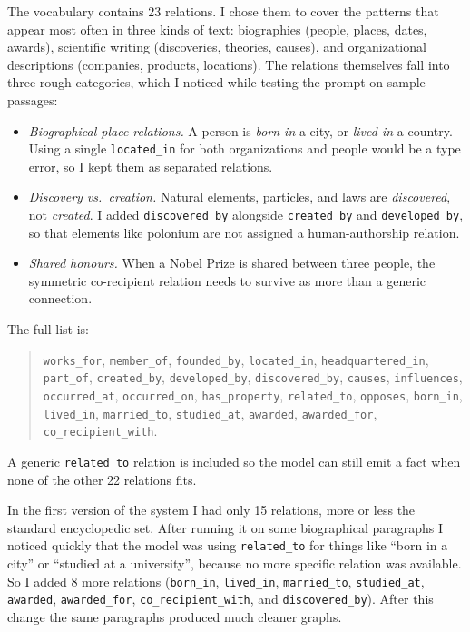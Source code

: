 \documentclass[11pt,a4paper]{article}
\begin{document}
The vocabulary contains 23 relations. I chose them to cover the patterns that appear most often in three kinds of text: biographies (people, places, dates, awards), scientific writing (discoveries, theories, causes), and organizational descriptions (companies, products, locations). The relations themselves fall into three rough categories, which I noticed while testing the prompt on sample passages:

\begin{itemize}[leftmargin=1.5em]
  \item \textit{Biographical place relations.} A person is \emph{born in} a city, or \emph{lived in} a country. Using a single \texttt{located\_in} for both organizations and people would be a type error, so I kept them as separated relations.
  \item \textit{Discovery vs.\ creation.} Natural elements, particles, and laws are \emph{discovered}, not \emph{created}. I added \texttt{discovered\_by} alongside \texttt{created\_by} and \texttt{developed\_by}, so that elements like polonium are not assigned a human-authorship relation.
  \item \textit{Shared honours.} When a Nobel Prize is shared between three people, the symmetric co-recipient relation needs to survive as more than a generic connection.
\end{itemize}

The full list is:

\begin{quote}\small
\texttt{works\_for}, \texttt{member\_of}, \texttt{founded\_by}, \texttt{located\_in}, \texttt{headquartered\_in}, \texttt{part\_of}, \texttt{created\_by}, \texttt{developed\_by}, \texttt{discovered\_by}, \texttt{causes}, \texttt{influences}, \texttt{occurred\_at}, \texttt{occurred\_on}, \texttt{has\_property}, \texttt{related\_to}, \texttt{opposes}, \texttt{born\_in}, \texttt{lived\_in}, \texttt{married\_to}, \texttt{studied\_at}, \texttt{awarded}, \texttt{awarded\_for}, \texttt{co\_recipient\_with}.
\end{quote}

A generic \texttt{related\_to} relation is included so the model can still emit a fact when none of the other 22 relations fits.

In the first version of the system I had only 15 relations, more or less the standard encyclopedic set. After running it on some biographical paragraphs I noticed quickly that the model was using \texttt{related\_to} for things like ``born in a city'' or ``studied at a university'', because no more specific relation was available. So I added 8 more relations (\texttt{born\_in}, \texttt{lived\_in}, \texttt{married\_to}, \texttt{studied\_at}, \texttt{awarded}, \texttt{awarded\_for}, \texttt{co\_recipient\_with}, and \texttt{discovered\_by}). After this change the same paragraphs produced much cleaner graphs.
\end{document}
